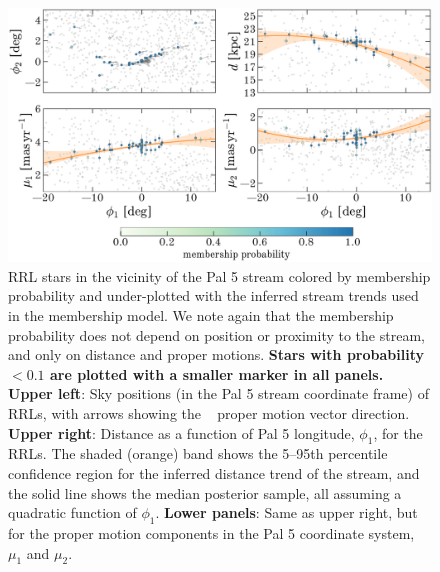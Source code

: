 \documentclass[twocolumn]{aastex63}
\newcommand{\changes}[1]{{\textbf{#1}}}
\begin{document}
\begin{figure}[t]
\begin{center}
\includegraphics[width=\textwidth]{tracks.pdf}
\caption{RRL stars in the vicinity of the Pal 5 stream colored by membership probability and under-plotted with the inferred stream trends used in the membership model.
We note again that the membership probability does not depend on position or proximity to the stream, and only on distance and proper motions.
\changes{Stars with probability $<0.1$ are plotted with a smaller marker in all panels.}
\textbf{Upper left}: Sky positions (in the Pal 5 stream coordinate frame) of RRLs, with arrows showing the \Gaia\  proper motion vector direction.
\textbf{Upper right}: Distance as a function of Pal 5 longitude, $\phi_1$, for the RRLs. The shaded (orange) band shows the 5--95th percentile confidence region for the inferred distance trend of the stream, and the solid line shows the median posterior sample, all assuming a quadratic function of $\phi_1$.
\textbf{Lower panels}: Same as upper right, but for the proper motion components in the Pal 5 coordinate system, $\mu_1$ and $\mu_2$.
}
\label{fig:trackmembers}
\end{center}
\end{figure}
\end{document}
